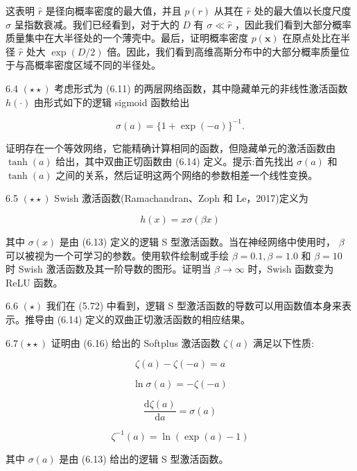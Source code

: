 \documentclass[10pt]{article}
\begin{document}
这表明 \(\widehat{r}\) 是径向概率密度的最大值，并且 \(p\left( r\right)\) 从其在 \(\widehat{r}\) 处的最大值以长度尺度 \(\sigma\) 呈指数衰减。我们已经看到，对于大的 \(D\) 有 \(\sigma  \ll  \widehat{r}\) ，因此我们看到大部分概率质量集中在大半径处的一个薄壳中。最后，证明概率密度 \(p\left( \mathbf{x}\right)\) 在原点处比在半径 \(\widehat{r}\) 处大 \(\exp \left( {D/2}\right)\) 倍。因此，我们看到高维高斯分布中的大部分概率质量位于与高概率密度区域不同的半径处。

6.4 \(\left( {\star  \star  }\right)\) 考虑形式为 (6.11) 的两层网络函数，其中隐藏单元的非线性激活函数 \(h\left( \cdot \right)\) 由形式如下的逻辑 sigmoid 函数给出

\[
\sigma \left( a\right)  = \{ 1 + \exp \left( {-a}\right) {\} }^{-1}. \tag{6.60}
\]

证明存在一个等效网络，它能精确计算相同的函数，但隐藏单元的激活函数由 \(\tanh \left( a\right)\) 给出，其中双曲正切函数由 (6.14) 定义。提示:首先找出 \(\sigma \left( a\right)\) 和 \(\tanh \left( a\right)\) 之间的关系，然后证明这两个网络的参数相差一个线性变换。

6.5 \(\left( {\star  \star  }\right)\) Swish 激活函数(Ramachandran、Zoph 和 Le，2017)定义为

\[
h\left( x\right)  = {x\sigma }\left( {\beta x}\right)  \tag{6.61}
\]

其中 \(\sigma \left( x\right)\) 是由 (6.13) 定义的逻辑 S 型激活函数。当在神经网络中使用时， \(\beta\) 可以被视为一个可学习的参数。使用软件绘制或手绘 \(\beta  = {0.1},\beta  = {1.0}\) 和 \(\beta  = {10}\) 时 Swish 激活函数及其一阶导数的图形。证明当 \(\beta  \rightarrow  \infty\) 时，Swish 函数变为 ReLU 函数。

6.6 \(\left( \star \right)\) 我们在 (5.72) 中看到，逻辑 S 型激活函数的导数可以用函数值本身来表示。推导由 (6.14) 定义的双曲正切激活函数的相应结果。

\({6.7}\left( {\star  \star  }\right)\) 证明由 (6.16) 给出的 Softplus 激活函数 \(\zeta \left( a\right)\) 满足以下性质:

\[
\zeta \left( a\right)  - \zeta \left( {-a}\right)  = a \tag{6.62}
\]

\[
\ln \sigma \left( a\right)  =  - \zeta \left( {-a}\right)  \tag{6.63}
\]

\[
\frac{\mathrm{d}\zeta \left( a\right) }{\mathrm{d}a} = \sigma \left( a\right)  \tag{6.64}
\]

\[
{\zeta }^{-1}\left( a\right)  = \ln \left( {\exp \left( a\right)  - 1}\right)  \tag{6.65}
\]

其中 \(\sigma \left( a\right)\) 是由 (6.13) 给出的逻辑 S 型激活函数。
\end{document}
